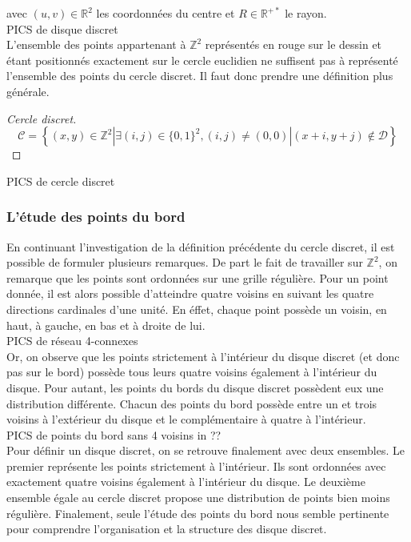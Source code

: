avec $(u,v) \in \mathbb{R}^{2}$ les coordonnées du centre et $R \in \mathbb{R}^{+*}$ le rayon.\\

PICS de disque discret\\

L'ensemble des points appartenant à $\mathbb{Z}^{2}$ représentés en rouge sur le dessin et étant positionnés exactement sur le cercle euclidien ne suffisent pas à représenté l'ensemble des points du cercle discret. Il faut donc prendre une définition plus générale.

\begin{proof}[Cercle discret]
  $$ \mathcal{C} =  \left\{ (x,y) \in \mathbb{Z}^{2} | \exists (i,j) \in \{0,1\}^2, (i,j) \ne (0,0) | (x+i,y+j) \notin \mathcal{D} \right\}$$
\end{proof}

PICS de cercle discret\\

\subsubsection{L'étude des points du bord}

En continuant l'investigation de la définition précédente du cercle discret, il est possible de formuler plusieurs remarques. De part le fait de travailler sur $\mathbb{Z}^{2}$, on remarque que les points sont ordonnées sur une grille régulière. Pour un point donnée, il est alors possible d'atteindre quatre voisins en suivant les quatre directions cardinales d'une unité. En éffet, chaque point possède un voisin, en haut, à gauche, en bas et à droite de lui. \\

PICS de réseau 4-connexes\\

Or, on observe que les points strictement à l'intérieur du disque discret (et donc pas sur le bord) possède tous leurs quatre voisins également à l'intérieur du disque. Pour autant, les points du bords du disque discret possèdent eux une distribution différente. Chacun des points du bord possède entre un et trois voisins à l'extérieur du disque et le complémentaire à quatre à l'intérieur.\\

PICS de points du bord sans 4 voisins in ??\\

Pour définir un disque discret, on se retrouve finalement avec deux ensembles. Le premier représente les points strictement à l'intérieur. Ils sont ordonnées avec exactement quatre voisins également à l'intérieur du disque. Le deuxième ensemble égale au cercle discret propose une distribution de points bien moins régulière. Finalement, seule l'étude des points du bord nous semble pertinente pour comprendre l'organisation et la structure des disque discret. 


